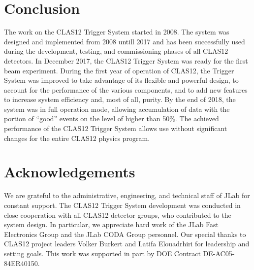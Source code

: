 \section{Conclusion}

The work on the CLAS12 Trigger System started in 2008. The system was designed and implemented from 2008 untill 2017 and has been successfully used during the development, testing, and commissioning phases of all CLAS12 detectors. In December 2017, the CLAS12 Trigger System was ready for the first beam experiment. During the first year of operation of CLAS12, the Trigger System was improved to take advantage of its flexible and powerful design, to account for the performance of the various components, and to add new features to increase system efficiency and, most of all, purity. By the end of 2018, the system was in full operation mode, allowing accumulation of data with the portion of ``good'' events on the level of higher than 50$\%$. The achieved performance of the CLAS12 Trigger System allows use without significant changes for the entire CLAS12 physics program.

\section{Acknowledgements}

We are grateful to the administrative, engineering, and technical staff of JLab for constant support. The CLAS12 Trigger System development was conducted in close cooperation with all CLAS12 detector groups, who contributed to the system design. In particular, we appreciate hard work of the JLab Fast Electronics Group and the JLab CODA Group personnel. Our special thanks to CLAS12 project leaders Volker Burkert and Latifa Elouadrhiri for leadership and setting goals. This work was supported in part by DOE Contract DE-AC05-84ER40150.

